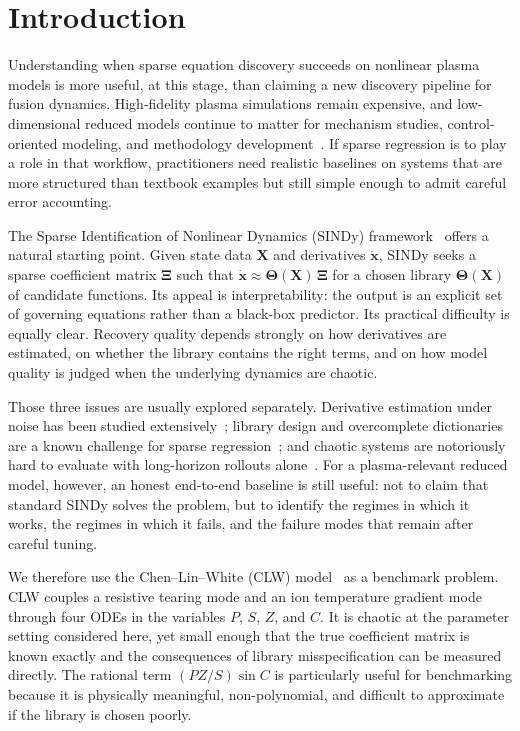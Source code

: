 \documentclass[12pt]{article}
\newcommand{\bX}{\mathbf{X}}
\newcommand{\bdx}{\dot{\mathbf{x}}}
\newcommand{\bXi}{\boldsymbol{\Xi}}
\newcommand{\bTheta}{\boldsymbol{\Theta}}
\begin{document}
\bigskip

\section{Introduction}
\label{sec:introduction}

Understanding when sparse equation discovery succeeds on nonlinear plasma models is more useful, at this stage, than claiming a new discovery pipeline for fusion dynamics.
High-fidelity plasma simulations remain expensive, and low-dimensional reduced models continue to matter for mechanism studies, control-oriented modeling, and methodology development~\cite{Chen1984,Horton1999}.
If sparse regression is to play a role in that workflow, practitioners need realistic baselines on systems that are more structured than textbook examples but still simple enough to admit careful error accounting.

The Sparse Identification of Nonlinear Dynamics (SINDy) framework~\cite{Brunton2016} offers a natural starting point.
Given state data $\bX$ and derivatives $\bdx$, SINDy seeks a sparse coefficient matrix $\bXi$ such that $\bdx \approx \bTheta(\bX)\,\bXi$ for a chosen library $\bTheta(\bX)$ of candidate functions.
Its appeal is interpretability: the output is an explicit set of governing equations rather than a black-box predictor.
Its practical difficulty is equally clear.
Recovery quality depends strongly on how derivatives are estimated, on whether the library contains the right terms, and on how model quality is judged when the underlying dynamics are chaotic.

Those three issues are usually explored separately.
Derivative estimation under noise has been studied extensively~\cite{Schaeffer2017,Rudy2017}; library design and overcomplete dictionaries are a known challenge for sparse regression~\cite{Mangan2016}; and chaotic systems are notoriously hard to evaluate with long-horizon rollouts alone~\cite{Strogatz2015}.
For a plasma-relevant reduced model, however, an honest end-to-end baseline is still useful: not to claim that standard SINDy solves the problem, but to identify the regimes in which it works, the regimes in which it fails, and the failure modes that remain after careful tuning.

We therefore use the Chen--Lin--White (CLW) model~\cite{Chen1984} as a benchmark problem.
CLW couples a resistive tearing mode and an ion temperature gradient mode through four ODEs in the variables $P$, $S$, $Z$, and $C$.
It is chaotic at the parameter setting considered here, yet small enough that the true coefficient matrix is known exactly and the consequences of library misspecification can be measured directly.
The rational term $(PZ/S)\sin C$ is particularly useful for benchmarking because it is physically meaningful, non-polynomial, and difficult to approximate if the library is chosen poorly.
\end{document}
